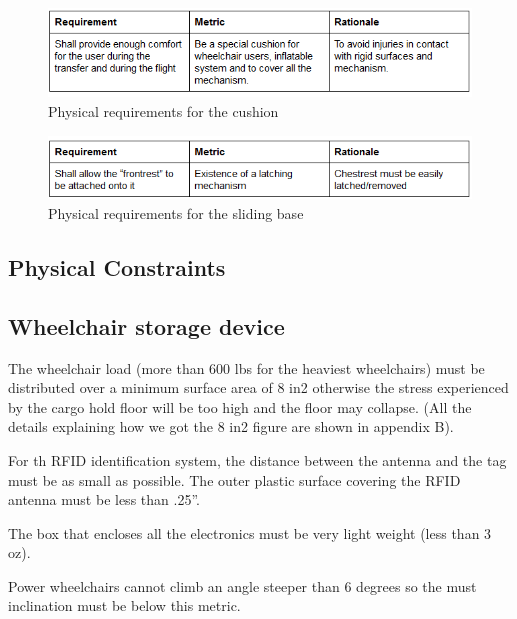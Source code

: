 \begin{figure}[h!]
  \centering
     \includegraphics[scale=1]{images/physical_requirements_cushion.png}
   \caption{Physical requirements for the cushion}
  \label{fig:phy_req_cushion}
\end{figure}

\begin{figure}[h!]
  \centering
     \includegraphics[scale=1]{images/physical_requirements_sliding_base.png}
   \caption{Physical requirements for the sliding base}
  \label{fig:phy_req_sliding_base}
\end{figure}

\newpage

\subsection{Physical Constraints}

\subsection*{Wheelchair storage device}

\begin{list}{-}{}
  \item The wheelchair load (more than 600 lbs for the heaviest wheelchairs) must be distributed over a minimum surface area of 8 in2 otherwise the stress experienced by the cargo hold floor will be too high and the floor may collapse. (All the details explaining how we got the 8 in2 figure are shown in appendix B).
  \item For th RFID identification system, the distance between the antenna and the tag must be as small as possible. The outer plastic surface covering the RFID antenna must be less than .25''.
  \item The box that encloses all the electronics must be very light weight (less than 3 oz).
  \item Power wheelchairs cannot climb an angle steeper than 6 degrees so the must inclination must be below this metric.
\end{list}

